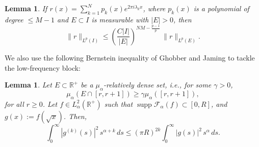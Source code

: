 \documentclass[11pt,a4paper,reqno,dvipsnames]{amsart}
\newcommand{\supp}{\operatorname{supp}}
\newcommand{\F}{\mathcal{F}}
\newcommand{\R}{\mathbb R}
\renewcommand{\ge}{\geqslant}
\renewcommand{\le}{\leqslant}
\numberwithin{equation}{section}
\theoremstyle{plain}
\newtheorem{lemma}[equation]{Lemma}
\theoremstyle{definition}
\theoremstyle{remark}
\begin{document}
\begin{lemma}
\label{nazarov-turan-kovrizhkin}
    If $r(x) = \sum_{k=1}^N p_k(x) e^{2\pi i\lambda_k x}$, where $p_k(x)$ is a polynomial of degree $\le M-1$ and $E \subset I$ is measurable with $|E| > 0$, then
    \begin{equation}
    \label{nazarov-turan-kovrizhkin-eqn}
        \|r\|_{L^p(I)} \le \left(\frac{C|I|}{|E|}\right)^{NM - \frac{p-1}{p}}\, \|r\|_{L^p(E)}.
    \end{equation}
\end{lemma}

We also use the following Bernstein inequality of Ghobber and Jaming \cite{gj} to tackle the low-frequency block:

\begin{lemma}
    \label{lemma-bernstein}
    Let $E \subset \R^+$ be a $\mu_\alpha$-relatively dense set, i.e., for some $\gamma > 0$, 
    $$\mu_\alpha(E \cap [r,r+1]) \ge \gamma \mu_\alpha([r,r+1]),$$
    for all $r\ge 0$. Let $f\in L^2_\alpha(\R^+)$ such that $\supp \F_\alpha (f) \subset [0,R]$, and $g(x) := f(\sqrt x)$. Then,
    \begin{equation}
        \int_0^\infty |g^{(k)}(s)|^2\, s^{\alpha + k}\, ds \le (\pi R)^{2k} \int_0^\infty |g(s)|^2\, s^\alpha \, ds.
    \end{equation}
\end{lemma}
\end{document}
